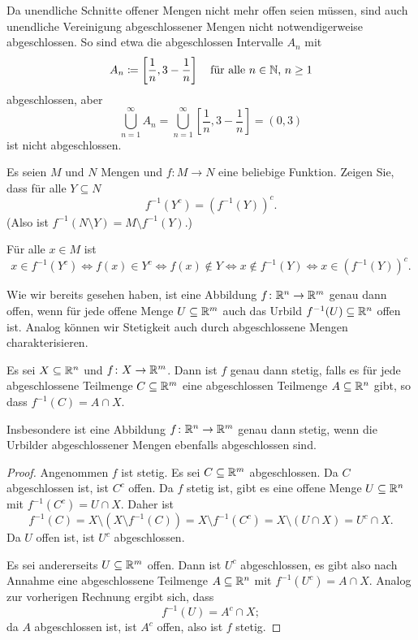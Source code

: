 \documentclass[a4paper,10pt]{article}
\begin{document}
\begin{bem}
 Da unendliche Schnitte offener Mengen nicht mehr offen seien müssen, sind auch unendliche Vereinigung abgeschlossener Mengen nicht notwendigerweise abgeschlossen. So sind etwa die abgeschlossen Intervalle $A_n$ mit
 \[
  A_n \coloneqq \left[ \frac{1}{n}, 3-\frac{1}{n} \right]
  \quad \text{für alle $n \in \mathbb{N}$, $n \geq 1$}
 \]
 abgeschlossen, aber
 \[
  \bigcup_{n=1}^\infty A_n
  = \bigcup_{n=1}^\infty \left[ \frac{1}{n}, 3-\frac{1}{n} \right]
  = (0, 3)
 \]
 ist nicht abgeschlossen.
\end{bem}


\begin{question}
 Es seien $M$ und $N$ Mengen und $f \colon M \to N$ eine beliebige Funktion. Zeigen Sie, dass für alle $Y \subseteq N$
 \[
  f^{-1}(Y^c) = (f^{-1}(Y))^c.
 \]
 (Also ist $f^{-1}(N \setminus Y) = M \setminus f^{-1}(Y)$.)
\end{question}
\begin{solution}
 Für alle $x \in M$ ist
 \[
  x \in f^{-1}(Y^c)
  \Leftrightarrow f(x) \in Y^c
  \Leftrightarrow f(x) \notin Y
  \Leftrightarrow x \notin f^{-1}(Y)
  \Leftrightarrow x \in (f^{-1}(Y))^c.
 \]
\end{solution}


Wie wir bereits gesehen haben, ist eine Abbildung $f \colon \mathbb{R}^n \to \mathbb{R}^m$ genau dann offen, wenn für jede offene Menge $U \subseteq \mathbb{R}^m$ auch das Urbild $f^{-1}(U) \subseteq \mathbb{R}^n$ offen ist. Analog können wir Stetigkeit auch durch abgeschlossene Mengen charakterisieren.


\begin{lem}
 Es sei $X \subseteq \mathbb{R}^n$ und $f \colon X \to \mathbb{R}^m$. Dann ist $f$ genau dann stetig, falls es für jede abgeschlossene Teilmenge $C \subseteq \mathbb{R}^m$ eine abgeschlossen Teilmenge $A \subseteq \mathbb{R}^n$ gibt, so dass $f^{-1}(C) = A \cap X$.
 
 Insbesondere ist eine Abbildung $f \colon \mathbb{R}^n \to \mathbb{R}^m$ genau dann stetig, wenn die Urbilder abgeschlossener Mengen ebenfalls abgeschlossen sind.
\end{lem}
\begin{proof}
 Angenommen $f$ ist stetig. Es sei $C \subseteq \mathbb{R}^m$ abgeschlossen. Da $C$ abgeschlossen ist, ist $C^c$ offen. Da $f$ stetig ist, gibt es eine offene Menge $U \subseteq \mathbb{R}^n$ mit $f^{-1}(C^c) = U \cap X$. Daher ist
 \[
  f^{-1}(C)
  = X \setminus (X \setminus f^{-1}(C))
  = X \setminus f^{-1}(C^c)
  = X \setminus (U \cap X)
  = U^c \cap X.
 \]
 Da $U$ offen ist, ist $U^c$ abgeschlossen.
 
 Es sei andererseits $U \subseteq \mathbb{R}^m$ offen. Dann ist $U^c$ abgeschlossen, es gibt also nach Annahme eine abgeschlossene Teilmenge $A \subseteq \mathbb{R}^n$ mit $f^{-1}(U^c) = A \cap X$. Analog zur vorherigen Rechnung ergibt sich, dass
 \[
  f^{-1}(U) = A^c \cap X;
 \]
 da $A$ abgeschlossen ist, ist $A^c$ offen, also ist $f$ stetig.
\end{proof}
\end{document}
